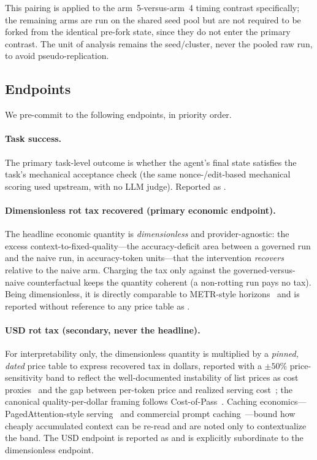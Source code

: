 This pairing is applied to the arm~5-versus-arm~4 timing contrast specifically;
the remaining arms are run on the shared seed pool but are not required to be
forked from the identical pre-fork state, since they do not enter the primary
contrast. The unit of analysis remains the seed/cluster, never the pooled raw
run, to avoid pseudo-replication.

\subsection{Endpoints}
\label{sec:intervention:endpoints}

We pre-commit to the following endpoints, in priority order.

\paragraph{Task success.} The primary task-level outcome is whether the agent's
final state satisfies the task's mechanical acceptance check (the same
nonce-/edit-based mechanical scoring used upstream, with no LLM judge). Reported
as .

\paragraph{Dimensionless rot tax recovered (primary economic endpoint).}
The headline economic quantity is \emph{dimensionless} and provider-agnostic:
the excess context-to-fixed-quality---the accuracy-deficit area between a
governed run and the naive run, in accuracy-token units---that the intervention
\emph{recovers} relative to the naive arm. Charging the tax only against the
governed-versus-naive counterfactual keeps the quantity coherent (a
non-rotting run pays no tax). Being dimensionless, it is directly comparable to
METR-style horizons~\cite{kwa2025metr} and is reported without reference to any
price table as .

\paragraph{USD rot tax (secondary, never the headline).}
For interpretability only, the dimensionless quantity is multiplied by a
\emph{pinned, dated} price table to express recovered tax in dollars, reported
with a $\pm 50\%$ price-sensitivity band to reflect the well-documented
instability of list prices as cost proxies~\cite{chen2026pricereversal} and the
gap between per-token price and realized serving cost~\cite{patil2026beyondtoken,erdil2025inference};
the canonical quality-per-dollar framing follows
Cost-of-Pass~\cite{erol2025costofpass}. Caching economics---PagedAttention-style
serving~\cite{kwon2023pagedattention} and commercial prompt
caching~\cite{anthropic2026promptcaching}---bound how cheaply accumulated
context can be re-read and are noted only to contextualize the band. The USD
endpoint is reported as  and is explicitly subordinate to the dimensionless endpoint.

